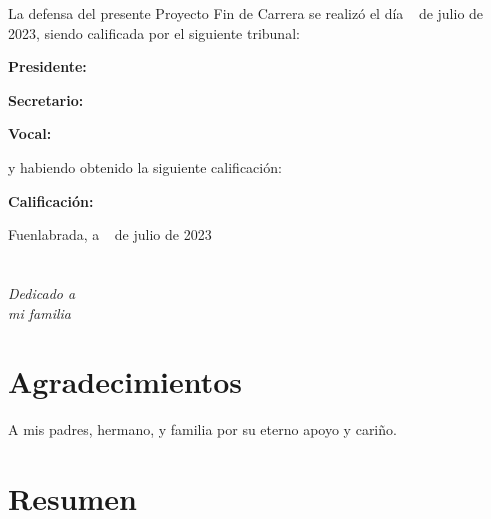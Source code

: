 \documentclass[a4paper, 12pt]{book}
\begin{document}
\vspace{1cm}
La defensa del presente Proyecto Fin de Carrera se realizó el día \qquad$\;\,$ de julio de 2023, siendo calificada por el siguiente tribunal:


\vspace{0.5cm}
\textbf{Presidente:}

\vspace{1.2cm}
\textbf{Secretario:}

\vspace{1.2cm}
\textbf{Vocal:}


\vspace{1.2cm}
y habiendo obtenido la siguiente calificación:

\vspace{1cm}
\textbf{Calificación:}


\vspace{1cm}
\begin{flushright}
Fuenlabrada, a \qquad$\;\,$ de julio de 2023
\end{flushright}


\chapter*{}
\begin{flushright}
\textit{Dedicado a \\
mi familia}
\end{flushright}


\chapter*{Agradecimientos}

A mis padres, hermano, y familia por su eterno apoyo y cariño.


\chapter*{Resumen}
\end{document}
